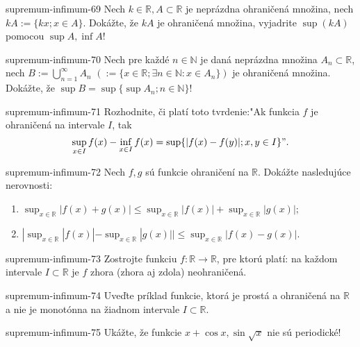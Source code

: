 \begin{defproblem}{supremum-infimum-69}
Nech $k\in\mathbb{R},A\subset\mathbb{R}$ je neprázdna ohraničená množina, nech
$kA:=\{kx;x\in A\}$. Dokážte, že $kA$ je ohraničená množina, vyjadrite $\sup
(kA)$ pomocou $\sup A,\inf A$!
\end{defproblem}

\begin{defproblem}{supremum-infimum-70}
Nech pre každé $n\in\mathbb{N}$ je daná neprázdna množina
$A_n\subset\mathbb{R}$, nech $B:=\bigcup_{n=1}^\infty A_n$
$(:=\{x\in\mathbb{R};\exists n\in\mathbb{N}:x\in A_n\})$ je ohraničená množina.
Dokážte, že $\sup B= \sup\{\sup A_n;n\in\mathbb{N}\}$!
\end{defproblem}

\begin{defproblem}{supremum-infimum-71}
Rozhodnite, či platí toto tvrdenie:"Ak funkcia $f$ je ohraničená na intervale
$I$, tak $$\sup_{x\in I}f(x)-\inf_{x\in I}f(x)=\sup \{|f(x)-f(y)|;x,y\in I\}".$$
\end{defproblem}

\begin{defproblem}{supremum-infimum-72}
Nech $f,g$ sú funkcie ohraničení na $\mathbb{R}$. Dokážte nasledujúce nerovnosti:
\begin{enumerate}
\item $\sup_{x\in\mathbb{R}}|f(x)+g(x)|\leq\sup_{x\in\mathbb{R}}|f(x)|+\sup_{x\in\mathbb{R}}|g(x)|;$
\item $|\sup_{x\in\mathbb{R}}|f(x)|-\sup_{x\in\mathbb{R}}|g(x)||\leq\sup_{x\in\mathbb{R}}|f(x)-g(x)|$.
\end{enumerate}
\end{defproblem}

\begin{defproblem}{supremum-infimum-73}
Zostrojte funkciu $f:\mathbb{R}\rightarrow\mathbb{R}$, pre ktorú platí: na
každom intervale $I\subset\mathbb{R}$ je $f$ zhora (zhora aj zdola)
neohraničená.
\end{defproblem}

\begin{defproblem}{supremum-infimum-74}
Uveďte príklad funkcie, ktorá je prostá a ohraničená na $\mathbb{R}$ a nie je
monotónna na žiadnom intervale $I\subset\mathbb{R}$.
\end{defproblem}

\begin{defproblem}{supremum-infimum-75}
Ukážte, že funkcie $x+\cos x,\sin\sqrt{x}$ nie sú periodické!
\end{defproblem}


